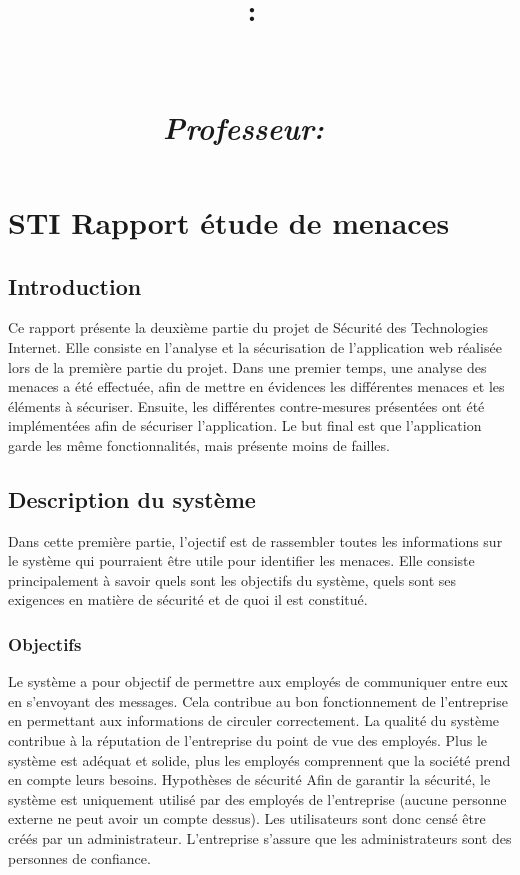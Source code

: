 \documentclass{article}
\title{
\vspace{2in}
\textmd{\textbf{\hmwkClass:\ \hmwkTitle}}\\
\textmd{\textbf{\hmwkProjectTitle}}\\
\normalsize\vspace{0.1in}\small{\hmwkDueDate}\\
\vspace{0.1in}\large{\textit{Professeur:\ \hmwkClassInstructor\ \hmwkClassTime}}
\vspace{3in}
}
\author{\textbf{\hmwkAuthorName}}
\date{} %
\begin{document}
\maketitle



\newpage
\tableofcontents
\newpage

\section{STI Rapport étude de menaces}

\subsection{Introduction}

Ce rapport présente la deuxième partie du projet de Sécurité des
Technologies Internet. Elle consiste en l'analyse et la sécurisation de
l'application web réalisée lors de la première partie du projet. Dans
une premier temps, une analyse des menaces a été effectuée, afin de
mettre en évidences les différentes menaces et les éléments à sécuriser.
Ensuite, les différentes contre-mesures présentées ont été implémentées
afin de sécuriser l'application. Le but final est que l'application
garde les même fonctionnalités, mais présente moins de failles.

\subsection{Description du système}

Dans cette première partie, l'ojectif est de rassembler toutes les
informations sur le système qui pourraient être utile pour identifier
les menaces. Elle consiste principalement à savoir quels sont les
objectifs du système, quels sont ses exigences en matière de sécurité et
de quoi il est constitué.

\subsubsection{Objectifs}

Le système a pour objectif de permettre aux employés de communiquer
entre eux en s'envoyant des messages. Cela contribue au bon
fonctionnement de l'entreprise en permettant aux informations de
circuler correctement. La qualité du système contribue à la réputation
de l'entreprise du point de vue des employés. Plus le système est
adéquat et solide, plus les employés comprennent que la société prend en
compte leurs besoins. Hypothèses de sécurité Afin de garantir la
sécurité, le système est uniquement utilisé par des employés de
l'entreprise (aucune personne externe ne peut avoir un compte dessus).
Les utilisateurs sont donc censé être créés par un administrateur.
L'entreprise s'assure que les administrateurs sont des personnes de
confiance.
\end{document}
